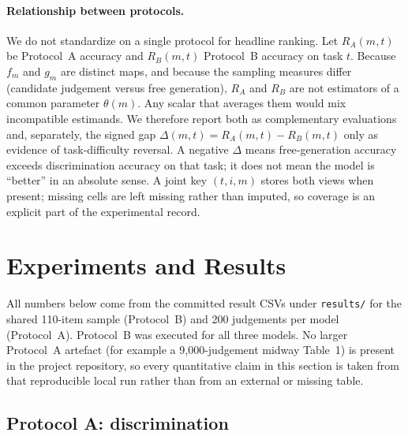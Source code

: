 \documentclass[11pt]{article}
\begin{document}
\paragraph{Relationship between protocols.}
We do not standardize on a single protocol for headline ranking. Let $R_A(m,t)$
be Protocol~A accuracy and $R_B(m,t)$ Protocol~B accuracy on task $t$. Because
$f_m$ and $g_m$ are distinct maps, and because the sampling measures differ
(candidate judgement versus free generation), $R_A$ and $R_B$ are not estimators
of a common parameter $\theta(m)$. Any scalar that averages them would mix
incompatible estimands. We therefore report both as complementary evaluations
and, separately, the signed gap $\Delta(m,t)=R_A(m,t)-R_B(m,t)$ only as evidence
of task-difficulty reversal. A negative $\Delta$ means free-generation accuracy
exceeds discrimination accuracy on that task; it does not mean the model is
``better'' in an absolute sense. A joint key $(t,i,m)$ stores both views when
present; missing cells are left missing rather than imputed, so coverage is an
explicit part of the experimental record.

\section{Experiments and Results}

All numbers below come from the committed result CSVs under \texttt{results/}
for the shared 110-item sample (Protocol~B) and 200 judgements per model
(Protocol~A). Protocol~B was executed for all three models. No larger
Protocol~A artefact (for example a 9{,}000-judgement midway Table~1) is present
in the project repository, so every quantitative claim in this section is taken
from that reproducible local run rather than from an external or missing table.

\subsection{Protocol A: discrimination}
\end{document}

